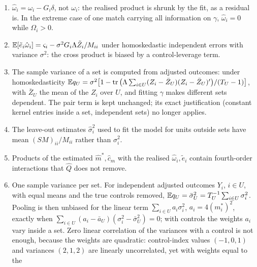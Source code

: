 \begin{enumerate}
$\hat Q_{\rm full}=\hat Q-2\tr(CS_dC\hat H)+\tr(C\hat HC\hat H)$, whose conditional mean is
$\tr\{C(S_d-\hat H)C(S_d-\hat H)\}$, while $\hat L=4\hat m'(S_d-\hat H)\hat m$ exactly. The middle term is the average
of $u'\hat Hu$ over the existing draws; the last needs $2k$ further applications of $C$, whereas the control term as implemented needs no
further solve. (Under the default  \fevc{} adds an offset pass of two solves per
point-estimate probe, 400 by default, to form the fixed-offset units;  avoids it.) $S_d-\hat H$ need not be
positive semidefinite, so it cannot be drawn from.
\item $\hat\omega_i=\omega_i-G_i\delta$, not $\omega_i$: the realised product is shrunk by the fit, as a residual is.
In the extreme case of one match carrying all information on $\gamma$, $\hat\omega_i=0$ while $\Omega_i>0$.
\item $\mathbb{E}[\tilde e_i\hat\omega_i]=\varsigma_i-\sigma^2G_i\Lambda\tilde Z_i/M_{ii}$ under homoskedastic independent errors
with variance $\sigma^2$: the cross product is biased by a control-leverage term.
\item The sample variance of a set is computed from adjusted outcomes: under homoskedasticity
$\mathbb{E} q_U=\sigma^2\big[1-\operatorname{tr}\big(\Lambda\sum_{i\in U}(Z_i-\bar Z_U)(Z_i-\bar Z_U)'\big)/(T_U-1)\big]$, with $\bar Z_U$ the
mean of the $Z_i$ over $U$, and fitting $\gamma$ makes different sets dependent. The pair term is kept unchanged;
its exact justification (constant kernel entries inside a set, independent sets) no longer applies.
\item The leave-out estimates $\hat\sigma_i^2$ used to fit the model for units outside sets have mean
$(SM)_{ii}/M_{ii}$ rather than $\sigma_i^2$.
\item Products of the estimated $\hat m^*,\hat c_m$ with the realised $\hat\omega_i,\tilde e_i$ contain fourth-order
interactions that $\hat Q$ does not remove.
\item One sample variance per set. For independent adjusted outcomes $Y_i$, $i\in U$, with equal means and the
true controls removed, $\mathbb{E} q_U=\bar\sigma_U^2=T_U^{-1}\sum_{i\in U}\sigma_i^2$. Pooling is then unbiased for the
linear term $\sum_{i\in U}a_i\sigma_i^2$, $a_i=4(m_i^*)^2$, exactly when
$\sum_{i\in U}(a_i-\bar a_U)(\sigma_i^2-\bar\sigma_U^2)=0$; with controls the weights $a_i$ vary inside a set. Zero
linear correlation of the variances with a control is not enough, because the weights are quadratic:
control-index values $(-1,0,1)$ and variances $(2,1,2)$ are linearly uncorrelated, yet with weights equal to the

\end{enumerate}
